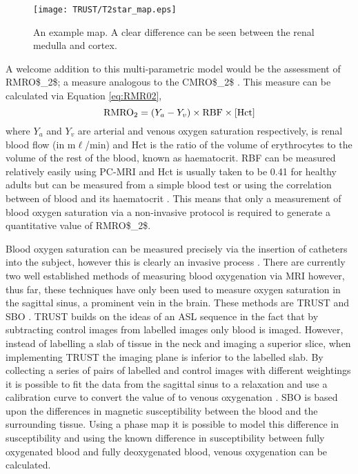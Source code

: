 \begin{figure}[H]
	\centering
	\texttt{[image: TRUST/T2star\_map.eps]}
	\caption{An example \ttwostar map. A clear difference can be seen between the renal medulla and cortex.}
	\label{fig:T2*map}	
\end{figure}

A welcome addition to this multi-parametric model would be the assessment of \ac{RMRO$_2$}; a measure analogous to the \ac{CMRO$_2$} \cite{chong_cerebral_2015}. This measure can be calculated via Equation \eqref{eq:RMR02},
\begin{equation}
\textup{RMRO}_{\textup{2}} = \left( Y_a - Y_v \right) \times \textup{RBF} \times \left[\textup{Hct}\right]
\label{eq:RMR02}
\end{equation}
where $Y_a$ and $Y_v$ are arterial and venous oxygen saturation respectively,  is renal blood flow (in m$\ell$/min) and Hct is the ratio of the volume of erythrocytes to the volume of the rest of the blood, known as haematocrit. \ac{RBF} can be measured relatively easily using \ac{PC}-\ac{MRI} \cite{jordan_velocity_1994} and Hct is usually taken to be 0.41 for healthy adults but can be measured from a simple blood test \cite{miao_reference_2002, gardener_dependence_2010} or using the correlation between \tone of blood and its haematocrit \cite{shimada_vivo_2012}. This means that only a measurement of blood oxygen saturation via a non-invasive protocol is required to generate a quantitative value of \ac{RMRO$_2$}.

Blood oxygen saturation can be measured precisely via the insertion of catheters into the subject, however this is clearly an invasive process \cite{nagdyman_comparison_2005}. There are currently two well established methods of measuring blood oxygenation via \ac{MRI} however, thus far, these techniques have only been used to measure oxygen saturation in the sagittal sinus, a prominent vein in the brain. These methods are \ac{TRUST} \cite{lu_quantitative_2008, xu_improving_2012, liu_testretest_2013, liu_multi-site_2016} and \ac{SBO} \cite{jain_mri_2010, jain_cerebral_2014, driver_global_2014, lee_multiplexed_2017}. \ac{TRUST} builds on the ideas of an \ac{ASL} sequence in the fact that by subtracting control images from labelled images only blood is imaged. However, instead of labelling a slab of tissue in the neck and imaging a superior slice, when implementing \ac{TRUST} the imaging plane is inferior to the labelled slab. By collecting a series of pairs of labelled and control images with different \ttwo weightings it is possible to fit the data from the sagittal sinus to a \ttwo relaxation and use a calibration curve to convert the value of \ttwo to venous oxygenation \cite{wright_estimating_1991}. \ac{SBO} is based upon the differences in magnetic susceptibility between the blood and the surrounding tissue. Using a phase map it is possible to model this difference in susceptibility and using the known difference in susceptibility between fully oxygenated blood and fully deoxygenated blood, venous oxygenation can be calculated.

